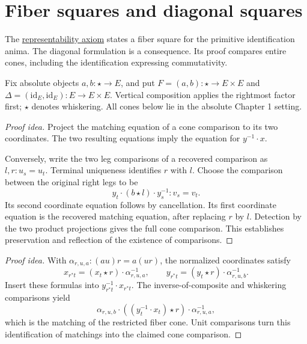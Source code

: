 \documentclass[11pt]{article}
\begin{document}
\section*{Fiber squares and diagonal squares}

The \href{pullbacks.html\#post:Representability_Of_Identifications}{representability axiom}
states a fiber square for the primitive identification anima.
The diagonal formulation is a consequence. Its proof compares entire cones,
including the identification expressing commutativity.

Fix absolute objects $a,b\colon\star\to E$, and put
$F=(a,b)\colon\star\to E\times E$ and
$\Delta=(\mathrm{id}_E,\mathrm{id}_E)\colon E\to E\times E$.
Vertical composition applies the rightmost factor first; $\star$ denotes whiskering.
All cones below lie in the absolute Chapter 1 setting.

\begin{proof}[Proof idea]
Project the matching equation of a cone comparison to its two coordinates.
The two resulting equations imply the equation for $y^{-1}\cdot x$.

Conversely, write the two leg comparisons of a recovered comparison as
$l,r\colon u_s=u_t$. Terminal uniqueness identifies $r$ with $l$.
Choose the comparison between the original right legs to be
\[
 y_t\cdot(b\star l)\cdot y_s^{-1}\colon v_s=v_t.
\]
Its second coordinate equation follows by cancellation. Its first coordinate
equation is the recovered matching equation, after replacing $r$ by $l$.
Detection by the two product projections gives the full cone comparison.
This establishes preservation and reflection of the existence of comparisons.
\end{proof}

\begin{proof}[Proof idea]
With $\alpha_{r,u,a}\colon(au)r=a(ur)$, the normalized coordinates satisfy
\[
 x_{r^*t}=(x_t\star r)\cdot\alpha_{r,u,a}^{-1},\qquad
 y_{r^*t}=(y_t\star r)\cdot\alpha_{r,u,b}^{-1}.
\]
Insert these formulas into $y_{r^*t}^{-1}\cdot x_{r^*t}$.
The inverse-of-composite and whiskering comparisons yield
\[
 \alpha_{r,u,b}\cdot((y_t^{-1}\cdot x_t)\star r)
                       \cdot\alpha_{r,u,a}^{-1},
\]
which is the matching of the restricted fiber cone. Unit comparisons
turn this identification of matchings into the claimed cone comparison.
\end{proof}
\end{document}
